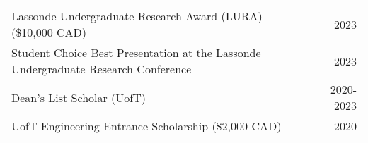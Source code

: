 
\begin{tabularx}{\textwidth}{@{}X r@{}}
    Lassonde Undergraduate Research Award (LURA) (\$10,000 CAD) & 2023 \\
    Student Choice Best Presentation at the Lassonde Undergraduate Research Conference & 2023 \\
    Dean's List Scholar (UofT) & 2020-2023 \\
    UofT Engineering Entrance Scholarship (\$2,000 CAD) & 2020 \\
\end{tabularx}
